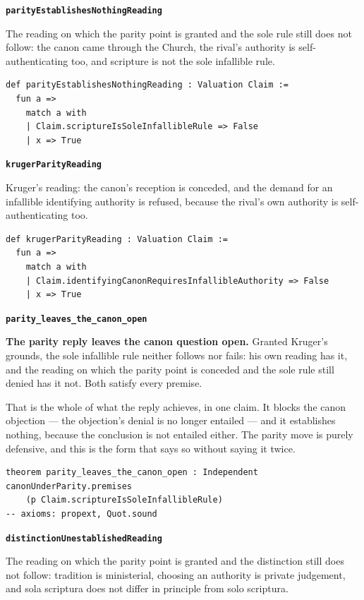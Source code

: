 \documentclass[11pt]{article}
\begin{document}
\par\medskip\noindent\textbf{\texttt{parity\allowbreak{}Establishes\allowbreak{}Nothing\allowbreak{}Reading}}\par\nobreak\noindent
The reading on which the parity point is granted and the sole rule still does not follow: the canon came through the Church, the rival’s authority is self-authenticating too, and scripture is not the sole infallible rule.

{\small\begin{verbatim}
def parityEstablishesNothingReading : Valuation Claim :=
  fun a =>
    match a with
    | Claim.scriptureIsSoleInfallibleRule => False
    | x => True
\end{verbatim}}
\par\medskip\noindent\textbf{\texttt{kruger\allowbreak{}Parity\allowbreak{}Reading}}\par\nobreak\noindent
Kruger’s reading: the canon’s reception is conceded, and the demand for an infallible identifying authority is refused, because the rival’s own authority is self-authenticating too.

{\small\begin{verbatim}
def krugerParityReading : Valuation Claim :=
  fun a =>
    match a with
    | Claim.identifyingCanonRequiresInfallibleAuthority => False
    | x => True
\end{verbatim}}
\par\medskip\noindent\textbf{\texttt{parity\_\allowbreak{}leaves\_\allowbreak{}the\_\allowbreak{}canon\_\allowbreak{}open}}\par\nobreak\noindent
\textbf{The parity reply leaves the canon question open.} Granted Kruger’s grounds, the sole infallible rule neither follows nor fails: his own reading has it, and the reading on which the parity point is conceded and the sole rule still denied has it not. Both satisfy every premise.

That is the whole of what the reply achieves, in one claim. It blocks the canon objection — the objection’s denial is no longer entailed — and it establishes nothing, because the conclusion is not entailed either. The parity move is purely defensive, and this is the form that says so without saying it twice.

{\small\begin{verbatim}
theorem parity_leaves_the_canon_open : Independent canonUnderParity.premises
    (p Claim.scriptureIsSoleInfallibleRule)
-- axioms: propext, Quot.sound
\end{verbatim}}
\par\medskip\noindent\textbf{\texttt{distinction\allowbreak{}Unestablished\allowbreak{}Reading}}\par\nobreak\noindent
The reading on which the parity point is granted and the distinction still does not follow: tradition is ministerial, choosing an authority is private judgement, and sola scriptura does not differ in principle from solo scriptura.
\end{document}
